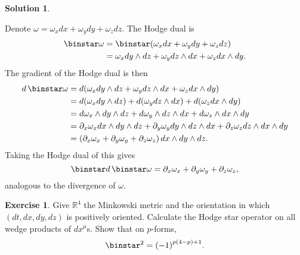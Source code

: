 \documentclass[11pt, a4paper]{report}
\theoremstyle{definition}
\newtheorem{exercise}{Exercise}[part]
\newtheorem{solution}{Solution}[part]
\newenvironment{ex}{\begin{exercise}}{\end{exercise}\pagebreak[1]}
\newenvironment{sol}{\begin{solution}}{\end{solution}\pagebreak[3]}
\renewcommand*{\d}{\ensuremath\mathop{}\mathopen{}d}
\renewcommand*{\star}{\ensuremath\mathop{}\mathopen\binstar\mathord{}}
\begin{document}
\begin{sol}\label{sol:divergence1form}

Denote $\omega = \omega_x dx + \omega_y dy + \omega_z dz$. The Hodge dual is
\begin{align*}
    \star \omega &= \star (\omega_x dx + \omega_y dy + \omega_z dz) \\
        &= \omega_x dy \wedge dz + \omega_y dz \wedge dx + \omega_z dx \wedge dy.
\end{align*}
The gradient of the Hodge dual is then
\begin{align*}
    d \star \omega &= d(\omega_x dy \wedge dz + \omega_y dz \wedge dx + \omega_z dx \wedge dy) \\
        &= d(\omega_x dy \wedge dz) + d(\omega_y dz \wedge dx) + d(\omega_z dx \wedge dy) \\
        &= d\omega_x \wedge dy \wedge dz + d\omega_y \wedge dz \wedge dx + d\omega_z \wedge dx \wedge dy \\
        &= \partial_x \omega_x dx \wedge dy \wedge dz + \partial_y \omega_y dy \wedge dz \wedge dx + \partial_z \omega_z dz \wedge dx \wedge dy \\
        &= (\partial_x \omega_x + \partial_y \omega_y + \partial_z \omega_z) \d x \wedge dy \wedge dz.
\end{align*}
Taking the Hodge dual of this gives
\[
    \star d \star \omega = \partial_x \omega_x + \partial_y \omega_y + \partial_z \omega_z,
\]
analogous to the divergence of $\omega$.

\end{sol}

\begin{ex}

Give $\mathbb{R}^4$ the Minkowski metric and the orientation in which $(dt, dx, dy, dz)$ is positively oriented. Calculate the Hodge star operator on all wedge products of $dx^\mu$s. Show that on $p$-forms,
\[
    \star^2 = {(-1)}^{p (4 - p) + 1}.
\]

\end{ex}
\end{document}

